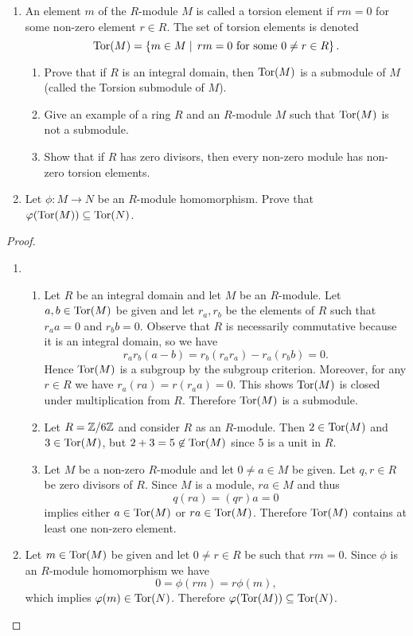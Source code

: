 \documentclass[10pt]{amsart}
\begin{document}
\begin{thm}
  \label{Ex3}
  \begin{enumerate}
  \item
    An element $m$ of the $R$-module $M$ is called a torsion element if $rm = 0$ for some non-zero element $r \in R$.
    The set of torsion elements is denoted 
    $$\operatorname{Tor}(M) = \left\{m \in M \mid\, rm = 0 \text{ for some } 0 \not = r \in R\right\}.$$
    \begin{enumerate}
    \item
      Prove that if $R$ is an integral domain, then $\operatorname{Tor}(M)$ is a submodule of $M$ (called the Torsion submodule of $M$).
    \item
      Give an example of a ring $R$ and an $R$-module $M$ such that $\operatorname{Tor}(M)$ is not a submodule.
    \item
      Show that if $R$ has zero divisors, then every non-zero module has non-zero torsion elements.
    \end{enumerate}
  \item
    Let $\phi: M \longrightarrow N$ be an $R$-module homomorphism.
    Prove that $\varphi(\operatorname{Tor}(M)) \subseteq \operatorname{Tor}(N)$.
  \end{enumerate}

  \begin{proof}
    \begin{enumerate}
    \item
      \begin{enumerate}
      \item
        Let $R$ be an integral domain and let $M$ be an $R$-module.  
        Let $a,b \in \operatorname{Tor}(M)$ be given and let $r_a,r_b$ be the elements of $R$ such that $r_a a = 0$ and $r_b b = 0$.
        Observe that $R$ is necessarily commutative because it is an integral domain, so we have 
        $$r_ar_b(a - b) = r_b(r_a r_a) - r_a(r_b b) = 0.$$
        Hence  $\operatorname{Tor}(M)$ is a subgroup by the subgroup criterion.
        Moreover, for any $r \in R$ we have $r_a(ra) = r(r_aa) = 0$.  
        This shows $\operatorname{Tor}(M)$ is closed under multiplication from $R$.
        Therefore $\operatorname{Tor}(M)$ is a submodule.
      \item
        Let $R = \mathbb{Z}/6\mathbb{Z}$ and consider $R$ as an $R$-module.
        Then $2 \in \operatorname{Tor}(M)$ and $3 \in \operatorname{Tor}(M)$, but $2 + 3 = 5 \not \in \operatorname{Tor}(M)$ since 5 is a unit in $R$.
      \item
        Let $M$ be a non-zero $R$-module and let $0 \not = a \in M$ be given.  
        Let $q,r \in R$ be zero divisors of $R$.
        Since $M$ is a module, $ra \in M$ and thus 
        $$q(ra) = (qr)a = 0$$
        implies either $a \in \operatorname{Tor}(M)$ or $ra \in \operatorname{Tor}(M)$.
        Therefore $\operatorname{Tor}(M)$ contains at least one non-zero element.
      \end{enumerate}
    \item
      Let $m \in \operatorname{Tor}(M)$ be given and let $0 \not = r \in R$ be such that $rm = 0$.
      Since $\phi$ is an $R$-module homomorphism we have 
      $$0 = \phi(rm) = r\phi(m),$$
      which implies $\varphi(m) \in \operatorname{Tor}(N)$.
      Therefore $\varphi(\operatorname{Tor}(M)) \subseteq \operatorname{Tor}(N)$.
    \end{enumerate}
  \end{proof}
\end{thm}
\end{document}
